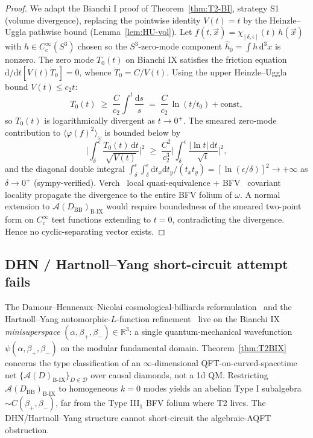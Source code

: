 \documentclass[11pt]{article}
\theoremstyle{definition}
\newcommand{\R}{\mathbb{R}}
\renewcommand{\AA}{\mathcal{A}}
\newcommand{\BIX}{\mathrm{B\text{-}IX}}
\newcommand{\BB}{\mathrm{BB}}
\begin{document}
\begin{proof}
We adapt the Bianchi I proof of Theorem~\ref{thm:T2-BI}, strategy S1 (volume divergence), replacing the pointwise identity $V(t)=t$ by the Heinzle--Uggla pathwise bound (Lemma~\ref{lem:HU-vol}). Let $f(t,\vec x)=\chi_{[\delta,\epsilon]}(t)\,h(\vec x)$ with $h\in C_c^\infty(S^3)$ chosen so the $S^3$-zero-mode component $\hat h_0=\int h\,\mathrm{d}^3 x$ is nonzero. The zero mode $T_0(t)$ on Bianchi IX satisfies the friction equation $\mathrm{d}/\mathrm{d}t[V(t)\dot T_0]=0$, whence $\dot T_0=C/V(t)$. Using the upper Heinzle--Uggla bound $V(t)\le c_2 t$:
\begin{equation*}
T_0(t) \;\ge\; \frac{C}{c_2}\int^t\frac{\mathrm{d}s}{s} \;=\; \frac{C}{c_2}\,\ln(t/t_0) + \mathrm{const},
\end{equation*}
so $T_0(t)$ is logarithmically divergent as $t\to 0^+$. The smeared zero-mode contribution to $\langle\varphi(f)^2\rangle_\omega$ is bounded below by
\begin{equation*}
\biggl|\!\int_\delta^\epsilon\frac{T_0(t)\,\mathrm{d}t}{\sqrt{V(t)}}\biggr|^2 \;\ge\; \frac{C^2}{c_2^3}\biggl|\!\int_\delta^\epsilon\frac{|\ln t|\,\mathrm{d}t}{\sqrt t}\biggr|^2,
\end{equation*}
and the diagonal double integral $\int_\delta^\epsilon\!\!\int_\delta^\epsilon\mathrm{d}t_x\mathrm{d}t_y/(t_x t_y) = [\ln(\epsilon/\delta)]^2\to+\infty$ as $\delta\to 0^+$ (sympy-verified). Verch~\cite{Verch1994} local quasi-equivalence + BFV~\cite{BrunettiFredenhagenVerch2003} covariant locality propagate the divergence to the entire BFV folium of $\omega$. A normal extension to $\AA(D_\BB)_\BIX$ would require boundedness of the smeared two-point form on $C_c^\infty$ test functions extending to $t=0$, contradicting the divergence. Hence no cyclic-separating vector exists.
\end{proof}

\subsection{DHN / Hartnoll--Yang short-circuit attempt fails}\label{sec:DHN-fail}

The Damour--Henneaux--Nicolai cosmological-billiards reformulation~\cite{DHN2002} and the Hartnoll--Yang automorphic-$L$-function refinement~\cite{HartnollYang2025} live on the Bianchi IX \emph{minisuperspace} $(\alpha,\beta_+,\beta_-)\in\R^3$: a single quantum-mechanical wavefunction $\psi(\alpha,\beta_+,\beta_-)$ on the modular fundamental domain. Theorem~\ref{thm:T2BIX} concerns the type classification of an $\infty$-dimensional QFT-on-curved-spacetime net $\{\AA(D)_\BIX\}_{D\in\mathcal D}$ over causal diamonds, not a 1d QM. Restricting $\AA(D_\BB)_\BIX$ to homogeneous $k=0$ modes yields an abelian Type I subalgebra $\sim C(\beta_+,\beta_-)$, far from the Type III$_1$ BFV folium where T2 lives. The DHN/Hartnoll--Yang structure cannot short-circuit the algebraic-AQFT obstruction.
\end{document}
